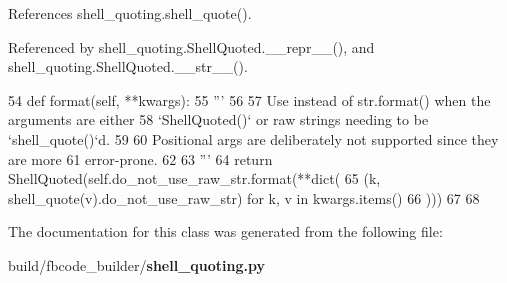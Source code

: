 References shell\+\_\+quoting.\+shell\+\_\+quote().



Referenced by shell\+\_\+quoting.\+Shell\+Quoted.\+\_\+\+\_\+repr\+\_\+\+\_\+(), and shell\+\_\+quoting.\+Shell\+Quoted.\+\_\+\+\_\+str\+\_\+\+\_\+().


\begin{DoxyCode}
54     \textcolor{keyword}{def }format(self, **kwargs):
55         \textcolor{stringliteral}{'''}
56 \textcolor{stringliteral}{}
57 \textcolor{stringliteral}{        Use instead of str.format() when the arguments are either}
58 \textcolor{stringliteral}{        `ShellQuoted()` or raw strings needing to be `shell\_quote()`d.}
59 \textcolor{stringliteral}{}
60 \textcolor{stringliteral}{        Positional args are deliberately not supported since they are more}
61 \textcolor{stringliteral}{        error-prone.}
62 \textcolor{stringliteral}{}
63 \textcolor{stringliteral}{        '''}
64         \textcolor{keywordflow}{return} ShellQuoted(self.do\_not\_use\_raw\_str.format(**dict(
65             (k, shell_quote(v).do\_not\_use\_raw\_str) \textcolor{keywordflow}{for} k, v \textcolor{keywordflow}{in} kwargs.items()
66         )))
67 
68 
\end{DoxyCode}


The documentation for this class was generated from the following file\+:\begin{DoxyCompactItemize}
\item 
build/fbcode\+\_\+builder/{\bf shell\+\_\+quoting.\+py}\end{DoxyCompactItemize}
